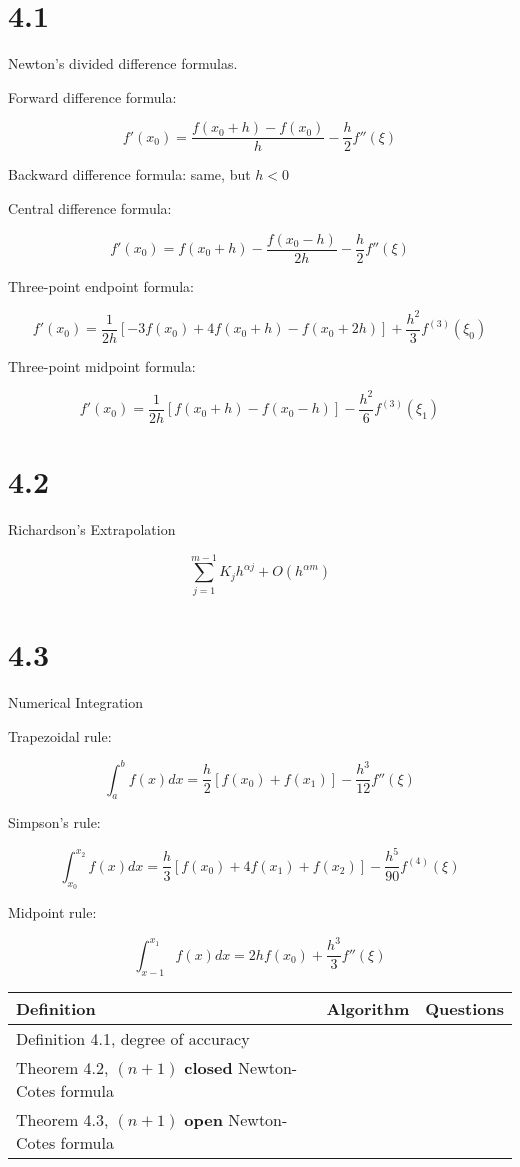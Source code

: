 \documentclass{article}
\begin{document}
\section*{4.1}

Newton's divided difference formulas.

Forward difference formula:

$$f'(x_0)=\frac{f(x_0+h) - f(x_0)}{h} - \frac{h}{2}f''(\xi)$$

Backward difference formula:  same, but $h < 0$

Central difference formula:

$$f'(x_0)=f(x_0 + h) - \frac{f(x_0-h)}{2h} - \frac{h}{2}f''(\xi)$$

Three-point endpoint formula:

$$f'(x_0)=\frac{1}{2h}[-3f(x_0)+4f(x_0+h)-f(x_0+2h)]+\frac{h^2}{3}f^{(3)}(\xi_0)$$

Three-point midpoint formula:

$$f'(x_0)=\frac{1}{2h}[f(x_0+h)-f(x_0-h)]-\frac{h^2}{6}f^{(3)}(\xi_1)$$

\section*{4.2}

Richardson's Extrapolation

$$\sum_{j=1}^{m-1} K_j h^{\alpha j} + O(h^{\alpha m})$$

\section*{4.3}

Numerical Integration

Trapezoidal rule:

$$\int_a^b f(x)dx=\frac{h}{2}[f(x_0)+f(x_1)] - \frac{h^3}{12} f''(\xi)$$

Simpson's rule:

$$\int_{x_0}^{x_2} f(x)dx= \frac{h}{3}[f(x_0) + 4f(x_1)+f(x_2)]- \frac{h^5}{90}f^{(4)}(\xi)$$

Midpoint rule:

$$\int_{x-1}^{x_1}f(x)dx=2hf(x_0)+ \frac{h^3}{3} f''(\xi)$$

\begin{tabularx}{\textwidth}{ |X|c|c| }
    \hline
	{\bf Definition} & {\bf Algorithm} & {\bf Questions} \\
    \hline
	Definition 4.1, degree of accuracy & & \\
    \hline
	Theorem 4.2, $(n+1)$ \textbf{closed} Newton-Cotes formula & & \\
    \hline
	Theorem 4.3, $(n+1)$ \textbf{open} Newton-Cotes formula & & \\
    \hline
\end{tabularx}
\end{document}
